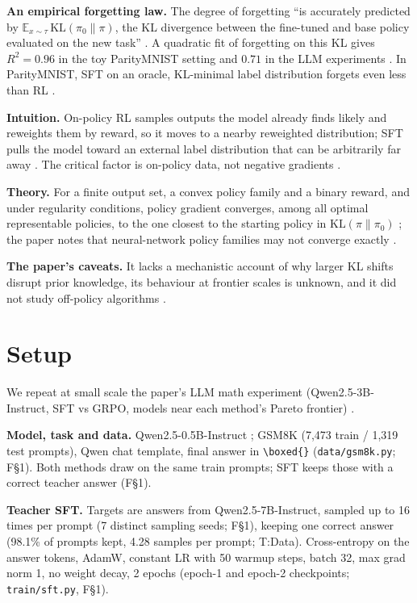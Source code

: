\documentclass[11pt]{article}
\newcommand{\T}[1]{\textsf{T:#1}}
\newcommand{\F}[1]{\textsf{F\S#1}}
\begin{document}
\textbf{An empirical forgetting law.} The degree of forgetting ``is accurately predicted by
$\mathbb{E}_{x\sim\tau}\,\mathrm{KL}(\pi_0\|\pi)$, the KL divergence between the fine-tuned and base policy
evaluated on the new task'' \cite[\S1, p.~2]{razor}. A quadratic fit of forgetting on this KL gives $R^2 = 0.96$ in the
toy ParityMNIST setting and $0.71$ in the LLM experiments \cite[\S4, p.~6]{razor}. In ParityMNIST, SFT on an oracle,
KL-minimal label distribution forgets even less than RL \cite[\S4, p.~6]{razor}.

\textbf{Intuition.} On-policy RL samples outputs the model already finds likely and reweights them by reward, so it
moves to a nearby reweighted distribution; SFT pulls the model toward an external label distribution that can be
arbitrarily far away \cite[abstract, p.~1; \S5.2, p.~8]{razor}. The critical factor is on-policy data, not negative
gradients \cite[\S5.1, p.~8]{razor}.

\textbf{Theory.} For a finite output set, a convex policy family and a binary reward, and under regularity
conditions, policy gradient converges, among all optimal representable policies, to the one closest to the starting
policy in $\mathrm{KL}(\pi\|\pi_0)$ \cite[Theorem~5.2, \S5.2, p.~8]{razor}; the paper notes that neural-network
policy families may not converge exactly \cite[App.~A, p.~18]{razor}.

\textbf{The paper's caveats.} It lacks a mechanistic account of why larger KL shifts disrupt prior knowledge, its
behaviour at frontier scales is unknown, and it did not study off-policy algorithms \cite[\S7, pp.~9--10]{razor}.

\section{Setup}
\label{sec:setup}
We repeat at small scale the paper's LLM math experiment (Qwen2.5-3B-Instruct, SFT vs GRPO, models near each
method's Pareto frontier) \cite[\S3.1, p.~4; App.~B.1, p.~18]{razor}.

\textbf{Model, task and data.} Qwen2.5-0.5B-Instruct \cite{qwen25}; GSM8K \cite{gsm8k} (7,473 train / 1,319 test
prompts), Qwen chat template, final answer in \verb|\boxed{}| (\texttt{data/gsm8k.py}; \F{1}). Both methods draw on
the same train prompts; SFT keeps those with a correct teacher answer (\F{1}).

\textbf{Teacher SFT.} Targets are answers from Qwen2.5-7B-Instruct, sampled up to 16 times per prompt (7 distinct sampling seeds; \F{1}), keeping one
correct answer (98.1\% of prompts kept, 4.28 samples per prompt; \T{Data}). Cross-entropy on the answer tokens, AdamW,
constant LR with 50 warmup steps, batch 32, max grad norm 1, no weight decay, 2 epochs (epoch-1 and epoch-2
checkpoints; \texttt{train/sft.py}, \F{1}).
\end{document}

